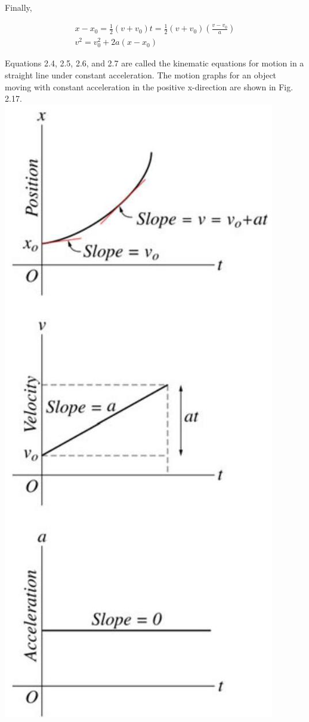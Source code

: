 \documentclass[10pt]{article}
\begin{document}
Finally,


\begin{gather*}
x-x_{0}=\frac{1}{2}\left(v+v_{0}\right) t=\frac{1}{2}\left(v+v_{0}\right)\left(\frac{v-v_{0}}{a}\right) \\
v^{2}=v_{0}^{2}+2 a\left(x-x_{0}\right) \tag{2.7}
\end{gather*}


Equations 2.4, 2.5, 2.6, and 2.7 are called the kinematic equations for motion in a straight line under constant acceleration. The motion graphs for an object moving with constant acceleration in the positive x-direction are shown in Fig. 2.17.\\
\includegraphics[max width=\textwidth, center]{2024_09_13_db1f357d2aad0a03eb2eg-034}
\end{document}
